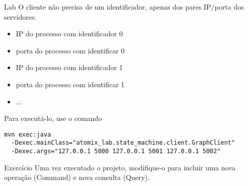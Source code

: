 \begin{frame}[fragile]{Lab}
O cliente não precisa de um identificador, apenas dos pares IP/porta dos servidores.
\begin{itemize}
	\item IP do processo com identificador 0
	\item porta do processo com identificar 0
	\item IP do processo com identificador 1
	\item porta do processo com identificar 1
	\item ...
\end{itemize}

Para executá-lo, use o comando
\begin{tiny}
\begin{verbatim}
mvn exec:java 
  -Dexec.mainClass="atomix_lab.state_machine.client.GraphClient"
  -Dexec.args="127.0.0.1 5000 127.0.0.1 5001 127.0.0.1 5002"
\end{verbatim}
\end{tiny}

\end{frame}

\begin{frame}{Exercício}
Uma vez executado o projeto, modifique-o para incluir uma nova operação (Command) e nova consulta (Query). 
\end{frame}
